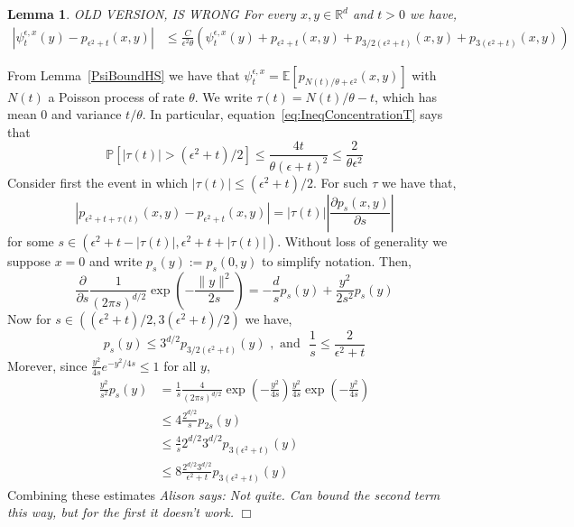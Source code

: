 \documentclass[12pt]{article}
\newenvironment {proof}{{\noindent\bf Proof }}{\hfill $\Box$ \medskip}
\newtheorem{lemma}[theorem]{Lemma}
\newcommand{\IP}{\mathbb P}
\newcommand{\IE}{\mathbb E}
\newcommand{\IR}{\mathbb R}
\newcommand{\comment}[1]{{\color{blue} \it #1}}
\begin{document}
\begin{lemma}
    OLD VERSION, IS WRONG
For every $x,y \in \IR^d$ and $t>0$ we have,
\begin{align*}
|\psi_t^{\epsilon,x}(y) - p_{\epsilon^2+t}(x,y)| &\leq \frac{C}{\epsilon^2 \theta}\left(\psi_t^{\epsilon,x}(y) + p_{\epsilon^2+t}(x,y) + p_{3/2(\epsilon^2+t)}(x,y)+p_{3(\epsilon^2+t)}(x,y) \right)
\end{align*} \label{Lemma:BoundPsiHS2}
\end{lemma}
\begin{proof}
From Lemma~\ref{PsiBoundHS} we have that $\psi_t^{\epsilon,x} = \IE\left[ p_{N(t)/\theta+\epsilon^2}(x,y) \right]$ with $N(t)$ a Poisson process of rate $\theta$. We write $\tau(t) = N(t)/\theta - t$, which has mean $0$ and variance $t/\theta$. In particular,
equation~\eqref{eq:IneqConcentrationT} says that
\begin{equation}
\IP[|\tau(t)| > (\epsilon^2+t)/2] \leq \frac{4t}{\theta(\epsilon+t)^2} \leq \frac{2}{\theta \epsilon^2} \label{eq:ConcentrationTau}
\end{equation}
Consider first the event in which $|\tau(t)| \leq (\epsilon^2+t)/2$. For such $\tau$ we have that,
\begin{equation} |p_{\epsilon^2+t+\tau(t)}(x,y) - p_{\epsilon^2+t}(x,y) | = |\tau(t)| \left| \frac{\partial p_s(x,y)}{\partial s} \right| \end{equation}
for some $s \in (\epsilon^2+t-|\tau(t)|, \epsilon^2+t+|\tau(t)|)$. Without loss of generality we suppose $x=0$ and write $p_s(y):=p_s(0,y)$ to simplify notation. Then,
\[ \frac{\partial}{\partial s} \frac{1}{(2 \pi s)^{d/2}} \exp(-\frac{\| y \|^2}{2s}) = - \frac{d}{s} p_s(y) + \frac{y^2}{2 s^2} p_s(y)\]
Now for $s \in ((\epsilon^2+t)/2,3(\epsilon^2+t)/2)$ we have,
\[ p_s(y) \leq 3^{d/2} p_{3/2(\epsilon^2+t)}(y) \, \, ,\text{ and } \, \, \frac{1}{s} \leq \frac{2}{\epsilon^2+t}\]
Morever, since $\frac{y^2}{4s} e^{-y^2/4s} \leq 1$ for all $y$,
\begin{align*}
\frac{y^2}{s^2}  p_s(y) &= \frac{1}{s} \frac{4}{(2 \pi s)^{d/2}}\exp(-\frac{y^2}{4s}) \frac{y^2}{4s} \exp( - \frac{y^2}{4 s}) \\ &\leq  4\frac{ 2^{d/2}}{s} p_{2s}(y) \\ &\leq \frac{4}{s}  2^{d/2} 3^{d/2} p_{3(\epsilon^2+t)}(y)  \\ & \leq 8 \frac{ 2^{d/2} 3^{d/2}}{\epsilon^2+t} p_{3(\epsilon^2+t)}(y)
\end{align*}
Combining these estimates
    \comment{Alison says: Not quite. Can bound the second term this way, but for the first it doesn't work.
}
\end{proof}
\end{document}
